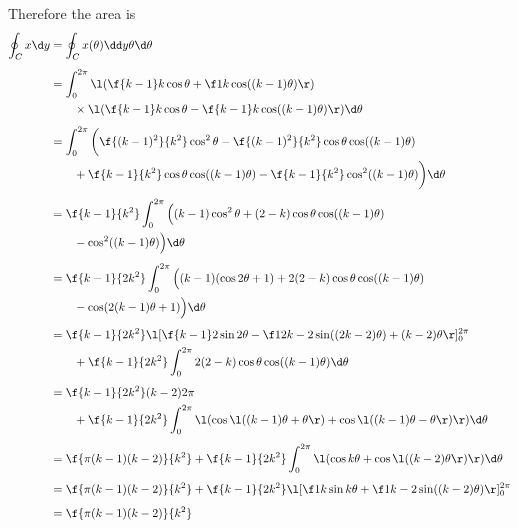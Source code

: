 \documentclass[a4paper]{article}
\begin{document}
Therefore the area is \begin{align*}
\oint_C x \d y &= \oint_C x(\theta) \dd y\theta \d \theta\\[1ex]
&= \int_0^{2\pi} \l(
	\f{k-1}k \cos \theta + \f1k \cos ((k-1) \theta) \r)
	\\ &\qquad \times \l(
		\f{k-1}k \cos \theta
		- \f{k-1}k \cos ((k-1) \theta)
	\r) \d \theta\\[1ex]
%
&= \int_0^{2\pi} \bigg(
	\f{(k-1)^2}{k^2} \cos^2 \theta
	- \f{(k-1)^2}{k^2} \cos \theta \cos ((k-1) \theta)
	\\ &\qquad + \f{k-1}{k^2} \cos \theta \cos ((k-1) \theta)
	- \f{k-1}{k^2} \cos^2 ((k-1) \theta)
\bigg) \d \theta\\[1ex]
%
&= \f{k-1}{k^2} \int_0^{2\pi} \Big(
	(k-1) \cos^2 \theta
	+ (2-k) \cos \theta \cos ((k-1) \theta)
	\\ &\qquad - \cos^2 ((k-1) \theta)
\Big) \d \theta\\[1ex]
%
&= \f{k-1}{2k^2} \int_0^{2\pi} \Big(
	(k-1) (\cos 2\theta + 1)
	+ 2(2-k) \cos \theta \cos ((k-1) \theta)
	\\ &\qquad - \cos (2(k-1) \theta + 1)
\Big) \d \theta\\[1ex]
%
&= \f{k-1}{2k^2} \l[
	\f{k-1}2 \sin 2\theta
	- \f1{2k-2} \sin ((2k-2) \theta)
	+ (k-2) \theta
\r]_0^{2\pi}
	\\ &\qquad + \f{k-1}{2k^2} \int_0^{2\pi}
		2(2-k) \cos \theta \cos ((k-1) \theta)
	\d \theta\\[1ex]
%
&= \f{k-1}{2k^2} (k-2) 2\pi
	\\ &\qquad + \f{k-1}{2k^2} \int_0^{2\pi} \l(
		\cos \l( (k-1) \theta + \theta \r) + \cos \l( (k-1) \theta - \theta \r)
	\r) \d \theta\\[1ex]
%
&= \f{\pi (k-1) (k-2)}{k^2}
	+ \f{k-1}{2k^2} \int_0^{2\pi} \l(
		\cos k \theta + \cos \l( (k-2) \theta \r)
	\r) \d \theta\\[1ex]
%
&= \f{\pi (k-1) (k-2)}{k^2}
	+ \f{k-1}{2k^2} \l[ \f1k \sin k \theta + \f1{k-2} \sin ((k-2) \theta) \r]_0^{2\pi}\\[1ex]
%
&= \f{\pi (k-1) (k-2)}{k^2}
\end{align*}

\end{document}

